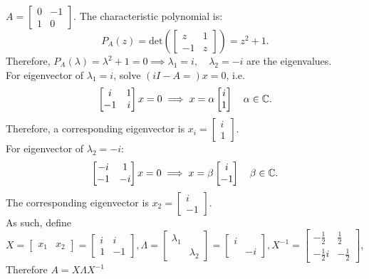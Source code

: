 \documentclass[../main/main.tex]{subfiles}
\begin{document}
\begin{example}
	$A=\begin{bmatrix} 0&-1\\1&0 \end{bmatrix} $. The characteristic polynomial is: \[
		P_A(z)=\text{det}\left( \begin{bmatrix} z&1\\-1&z \end{bmatrix}  \right) =z^2+1
	.\] Therefore, $P_A(\lambda)=\lambda^2+1=0 \implies \lambda_1=i,\quad \lambda_2=-i$ are the eigenvalues. \\For eigenvector of $\lambda_1=i$, solve $\left( i I-A= \right) x=0$, i.e. \[
		\begin{bmatrix} i&1\\-1&i \end{bmatrix} x=0\implies x=\alpha\begin{bmatrix} i\\1 \end{bmatrix} \quad \alpha\in \mathbb{C}
	.\] Therefore, a corresponding eigenvector is $x_{i}=\begin{bmatrix} i\\1 \end{bmatrix} $.\\For eigenvector of $\lambda_2=-i$: \[
		\begin{bmatrix} -i&1\\-1&-i \end{bmatrix} x=0\implies x=\beta\begin{bmatrix} i\\-1 \end{bmatrix} \quad\beta\in \mathbb{C}
	.\] The corresponding eigenvector is $x_2=\begin{bmatrix} i\\-1 \end{bmatrix} $.\\ As such, define $X=\begin{bmatrix} x_1&x_2 \end{bmatrix} =\begin{bmatrix} i&i\\1&-1 \end{bmatrix},\Lambda=\begin{bmatrix} \lambda_1&\\&\lambda_2 \end{bmatrix} =\begin{bmatrix} i&\\&-i \end{bmatrix},X^{-1}=\begin{bmatrix} -\frac{1}{2}&\frac{1}{2}\\-\frac{1}{2}i&-\frac{1}{2} \end{bmatrix} $,\\Therefore $A=X\Lambda X^{-1}$ \[
\]
\end{example}
\end{document}

